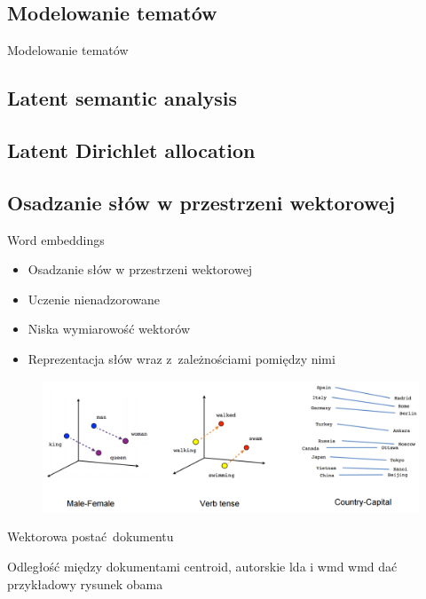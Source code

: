 \documentclass{beamer}
\begin{document}
	\subsection{Modelowanie tematów}
	\begin{frame}{Modelowanie tematów}
	\end{frame}
	\subsection{Latent semantic analysis}
	\subsection{Latent Dirichlet allocation}
	\subsection{Osadzanie słów w przestrzeni wektorowej}
	\begin{frame}{Word embeddings}
		\begin{itemize}
			\item Osadzanie słów w przestrzeni wektorowej
			\item Uczenie nienadzorowane
			\item Niska wymiarowość wektorów
			\item Reprezentacja słów wraz z~zależnościami pomiędzy nimi
		\end{itemize}
		\pause
		\begin{figure}
			\centering
			\includegraphics[width=1\textwidth]{img/linear-relationships.png}
		\end{figure}
	\end{frame}
	\begin{frame}{Wektorowa postać dokumentu}
		
	\end{frame}
	
	\begin{frame}{Odległość między dokumentami}
		centroid, autorskie lda i wmd
		wmd dać przykładowy rysunek obama
	\end{frame}
\end{document}
